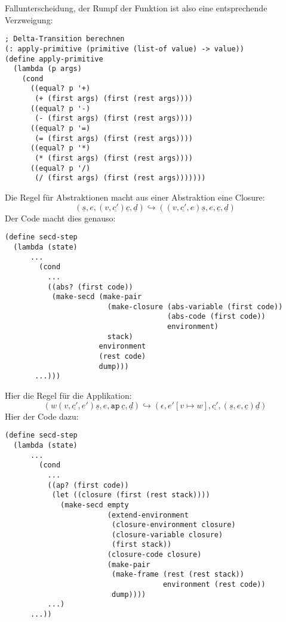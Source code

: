 Fallunterscheidung, der Rumpf der Funktion ist also eine entsprechende
Verzweigung:
%
\begin{verbatim}
; Delta-Transition berechnen
(: apply-primitive (primitive (list-of value) -> value))
(define apply-primitive
  (lambda (p args)
    (cond
      ((equal? p '+)
       (+ (first args) (first (rest args))))
      ((equal? p '-)
       (- (first args) (first (rest args))))
      ((equal? p '=)
       (= (first args) (first (rest args))))
      ((equal? p '*)
       (* (first args) (first (rest args))))
      ((equal? p '/)
       (/ (first args) (first (rest args)))))))
\end{verbatim}
%
Die Regel für Abstraktionen macht aus einer Abstraktion eine Closure:
\begin{displaymath}
  (\underline{s}, e, (v, \underline{c'}) \underline{c}, \underline{d})
  \hookrightarrow
  ((v, \underline{c'}, e) \underline{s}, e, \underline{c}, \underline{d})
\end{displaymath}
%
Der Code macht dies genauso:
%
\begin{verbatim}
(define secd-step
  (lambda (state)
      ...
        (cond
          ...
          ((abs? (first code))
           (make-secd (make-pair
                        (make-closure (abs-variable (first code))
                                      (abs-code (first code))
                                      environment)
                        stack)
                      environment
                      (rest code)
                      dump)))
       ...)))
\end{verbatim}
%
Hier die Regel für die Applikation:
%
\begin{displaymath}
  (w (v,\underline{c'}, e') \underline{s}, e, \mathtt{ap}~\underline{c}, \underline{d})
  \hookrightarrow
  (\epsilon, e'[v\mapsto w], \underline{c'}, (\underline{s}, e, \underline{c}) \underline{d})
\end{displaymath}
%
Hier der Code dazu:
%
\begin{verbatim}
(define secd-step
  (lambda (state)
      ...
        (cond
          ...
          ((ap? (first code))
           (let ((closure (first (rest stack))))
             (make-secd empty  
                        (extend-environment
                         (closure-environment closure)
                         (closure-variable closure)
                         (first stack))
                        (closure-code closure)
                        (make-pair
                         (make-frame (rest (rest stack))
                                     environment (rest code))
                         dump))))
          ...)
      ...))
\end{verbatim}
